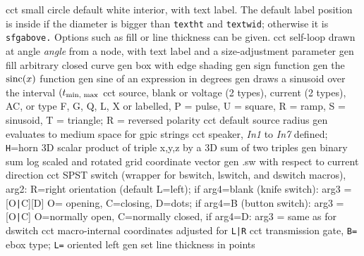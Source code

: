   {cct}
  {small circle default white interior, with text label. The default label
  position is inside if the diameter is bigger than {\tt textht} and
  {\tt textwid}; otherwise it is {\tt sfgabove.} Options such as fill or
  line thickness can be given.}
  {cct}
  {self-loop drawn at angle {\sl angle} from a node,
     with text label and a size-adjustment parameter }
  {gen}
  {fill arbitrary closed curve}
  {gen}
  {box with edge shading}
  {gen}
  {sign function}
  {gen}
  {the $\hbox{sinc}(x)$ function} 
  {gen}
  {sine of an expression in degrees}
  {gen}
  {draws a sinusoid over the interval $(t_{\hbox{\scriptsize min, max}}$}
  {cct}
  {source, blank or voltage (2 types), current (2 types), AC,
   or type F, G, Q, L, X or labelled, P = pulse, U = square, R = ramp,
   S = sinusoid, T = triangle; R = reversed polarity }
  {cct}
  {default source radius}
  {gen}
  {evaluates to medium space for gpic strings}
  {cct}
  {speaker, {\sl In1} to {\sl In7} defined; {\tt H}=horn}
  {3D}
  {scalar product of triple x,y,z by a}
  {3D}
  {sum of two triples}
  {gen}
  {binary sum}
  {log}
  {scaled and rotated grid coordinate vector}
  {gen}
  {.sw with respect to current direction}
  {cct}
  {SPST switch (wrapper for bswitch, lswitch, and dswitch macros),
    arg2: R=right orientation (default L=left);
     if arg4=blank (knife switch): arg3 = [O{\tt|}C][D]
       O= opening, C=closing, D=dots;
     if arg4=B (button switch): arg3 = [O{\tt|}C]
       O=normally open, C=normally closed,
     if arg4=D: arg3 = same as for dswitch }
  {cct}
  {macro-internal coordinates adjusted for {\tt L|R}}
  {cct}
  {transmission gate, {\tt B=} ebox type; {\tt L=} oriented left}
  {gen}
  {set line thickness in points}
